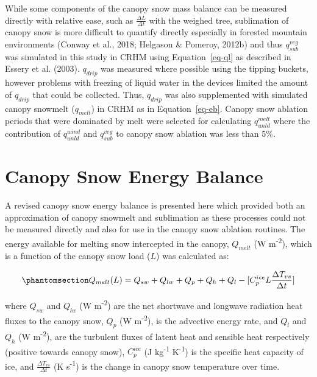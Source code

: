 \documentclass[
  letterpaper,
  DIV=11,
  numbers=noendperiod]{scrartcl}
\begin{document}
While some components of the canopy snow mass balance can be measured
directly with relative ease, such as \(\frac{\Delta L}{\Delta t}\) with
the weighed tree, sublimation of canopy snow is more difficult to
quantify directly especially in forested mountain environments (Conway
et al., 2018; Helgason \& Pomeroy, 2012b) and thus \(q_{sub}^{veg}\) was
simulated in this study in CRHM using Equation~\ref{eq-ql} as described
in Essery et al. (2003). \(q_{drip}\) was measured where possible using
the tipping buckets, however problems with freezing of liquid water in
the devices limited the amount of \(q_{drip}\) that could be collected.
Thus, \(q_{drip}\) was also supplemented with simulated canopy snowmelt
(\(q_{melt}\)) in CRHM as in Equation~\ref{eq-eb}. Canopy snow ablation
periods that were dominated by melt were selected for calculating
\(q_{unld}^{melt}\) where the contribution of \(q_{unld}^{wind}\) and
\(q_{sub}^{veg}\) to canopy snow ablation was less than 5\%.

\section{Canopy Snow Energy Balance}\label{canopy-snow-energy-balance}

A revised canopy snow energy balance is presented here which provided
both an approximation of canopy snowmelt and sublimation as these
processes could not be measured directly and also for use in the canopy
snow ablation routines. The energy available for melting snow
intercepted in the canopy, \(Q_{melt}\) (W m\textsuperscript{-2}), which
is a function of the canopy snow load (\(L\)) was calculated as:

\begin{equation}\phantomsection\label{eq-eb}{
Q_{melt}(L) = 
Q_{sw} +
Q_{lw} +
Q_{p} + Q_{h} + Q_{l} - [C_p^{ice} L \frac{\Delta T_{vs}}{\Delta t}]
}\end{equation}

where \(Q_{sw}\) and \(Q_{lw}\) (W m\textsuperscript{-2}) are the net
shortwave and longwave radiation heat fluxes to the canopy snow, \(Q_p\)
(W m\textsuperscript{-2}), is the advective energy rate, and \(Q_{l}\)
and \(Q_{h}\) (W m\textsuperscript{-2}), are the turbulent fluxes of
latent heat and sensible heat respectively (positive towards canopy
snow), \(C_p^{ice}\) (J kg\textsuperscript{-1} K\textsuperscript{-1}) is
the specific heat capacity of ice, and
\(\frac{\Delta T_{vs}}{\Delta t}\) (K s\textsuperscript{-1}) is the
change in canopy snow temperature over time.
\end{document}
